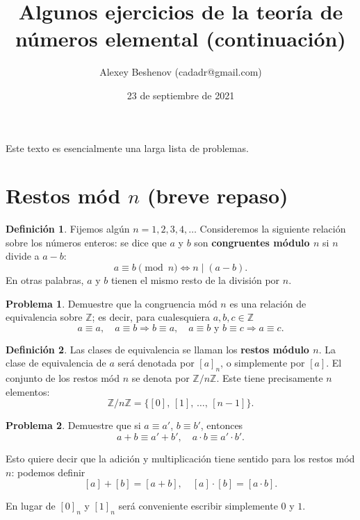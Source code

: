 \documentclass{article}
\title{Algunos ejercicios de la teoría de números elemental (continuación)}
\author{Alexey Beshenov (cadadr@gmail.com)}
\date{23 de septiembre de 2021}
\newcommand{\ZZ}{\mathbb{Z}}
\theoremstyle{definition}
\newtheorem{problema}{Problema}[section]
\newtheorem*{definicion}{Definición}
\begin{document}
\maketitle


Este texto es esencialmente una larga lista de problemas.

\setcounter{section}{-1}
\section{Restos mód $n$ (breve repaso)}

\begin{definicion}
  Fijemos algún $n = 1,2,3,4,\ldots$ Consideremos la siguiente relación sobre
  los números enteros: se dice que $a$ y $b$ son \textbf{congruentes módulo $n$}
  si $n$ divide a $a-b$:
  $$a \equiv b \pmod{n} \iff n \mid (a-b).$$
  En otras palabras, $a$ y $b$ tienen el mismo resto de la división por $n$.
\end{definicion}

\begin{problema}
  Demuestre que la congruencia mód $n$ es una relación de equivalencia sobre
  $\ZZ$; es decir, para cualesquiera $a,b,c\in \ZZ$
  \[
    a\equiv a, \quad
    a\equiv b \Rightarrow b\equiv a, \quad
    a\equiv b \text{ y } b\equiv c \Rightarrow a\equiv c.
  \]
\end{problema}

\begin{definicion}
  Las clases de equivalencia se llaman los \textbf{restos módulo $n$}. La clase
  de equivalencia de $a$ será denotada por $[a]_n$, o simplemente por $[a]$.
  El conjunto de los restos mód $n$ se denota por $\ZZ/n\ZZ$. Este tiene
  precisamente $n$ elementos:
  $$\ZZ/n\ZZ = \{ [0], \, [1], \, \ldots, \, [n-1] \}.$$
\end{definicion}

\begin{problema}
  Demuestre que si $a \equiv a'$, $b \equiv b'$, entonces
  \[ a+b \equiv a'+b', \quad a\cdot b \equiv a'\cdot b'. \]

  Esto quiere decir que la adición y multiplicación tiene sentido para los
  restos mód $n$: podemos definir
  \[ [a] + [b] = [a+b], \quad [a]\cdot [b] = [a\cdot b]. \]
\end{problema}

En lugar de $[0]_n$ y $[1]_n$ será conveniente escribir simplemente $0$ y $1$.
\end{document}
